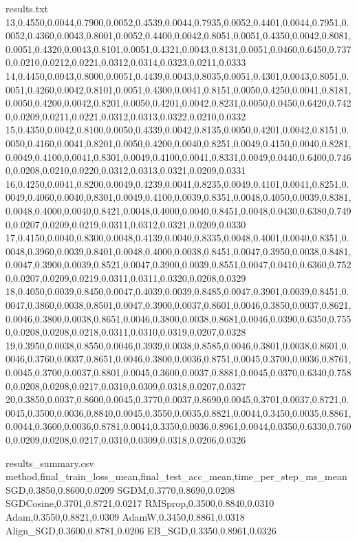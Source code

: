 \begin{filecontents*}{results.txt}
13,0.4550,0.0044,0.7900,0.0052,0.4539,0.0044,0.7935,0.0052,0.4401,0.0044,0.7951,0.0052,0.4360,0.0043,0.8001,0.0052,0.4400,0.0042,0.8051,0.0051,0.4350,0.0042,0.8081,0.0051,0.4320,0.0043,0.8101,0.0051,0.4321,0.0043,0.8131,0.0051,0.0460,0.6450,0.7370,0.0210,0.0212,0.0221,0.0312,0.0314,0.0323,0.0211,0.0333
14,0.4450,0.0043,0.8000,0.0051,0.4439,0.0043,0.8035,0.0051,0.4301,0.0043,0.8051,0.0051,0.4260,0.0042,0.8101,0.0051,0.4300,0.0041,0.8151,0.0050,0.4250,0.0041,0.8181,0.0050,0.4200,0.0042,0.8201,0.0050,0.4201,0.0042,0.8231,0.0050,0.0450,0.6420,0.7420,0.0209,0.0211,0.0221,0.0312,0.0313,0.0322,0.0210,0.0332
15,0.4350,0.0042,0.8100,0.0050,0.4339,0.0042,0.8135,0.0050,0.4201,0.0042,0.8151,0.0050,0.4160,0.0041,0.8201,0.0050,0.4200,0.0040,0.8251,0.0049,0.4150,0.0040,0.8281,0.0049,0.4100,0.0041,0.8301,0.0049,0.4100,0.0041,0.8331,0.0049,0.0440,0.6400,0.7460,0.0208,0.0210,0.0220,0.0312,0.0313,0.0321,0.0209,0.0331
16,0.4250,0.0041,0.8200,0.0049,0.4239,0.0041,0.8235,0.0049,0.4101,0.0041,0.8251,0.0049,0.4060,0.0040,0.8301,0.0049,0.4100,0.0039,0.8351,0.0048,0.4050,0.0039,0.8381,0.0048,0.4000,0.0040,0.8421,0.0048,0.4000,0.0040,0.8451,0.0048,0.0430,0.6380,0.7490,0.0207,0.0209,0.0219,0.0311,0.0312,0.0321,0.0209,0.0330
17,0.4150,0.0040,0.8300,0.0048,0.4139,0.0040,0.8335,0.0048,0.4001,0.0040,0.8351,0.0048,0.3960,0.0039,0.8401,0.0048,0.4000,0.0038,0.8451,0.0047,0.3950,0.0038,0.8481,0.0047,0.3900,0.0039,0.8521,0.0047,0.3900,0.0039,0.8551,0.0047,0.0410,0.6360,0.7520,0.0207,0.0209,0.0219,0.0311,0.0311,0.0320,0.0208,0.0329
18,0.4050,0.0039,0.8450,0.0047,0.4039,0.0039,0.8485,0.0047,0.3901,0.0039,0.8451,0.0047,0.3860,0.0038,0.8501,0.0047,0.3900,0.0037,0.8601,0.0046,0.3850,0.0037,0.8621,0.0046,0.3800,0.0038,0.8651,0.0046,0.3800,0.0038,0.8681,0.0046,0.0390,0.6350,0.7550,0.0208,0.0208,0.0218,0.0311,0.0310,0.0319,0.0207,0.0328
19,0.3950,0.0038,0.8550,0.0046,0.3939,0.0038,0.8585,0.0046,0.3801,0.0038,0.8601,0.0046,0.3760,0.0037,0.8651,0.0046,0.3800,0.0036,0.8751,0.0045,0.3700,0.0036,0.8761,0.0045,0.3700,0.0037,0.8801,0.0045,0.3600,0.0037,0.8881,0.0045,0.0370,0.6340,0.7580,0.0208,0.0208,0.0217,0.0310,0.0309,0.0318,0.0207,0.0327
20,0.3850,0.0037,0.8600,0.0045,0.3770,0.0037,0.8690,0.0045,0.3701,0.0037,0.8721,0.0045,0.3500,0.0036,0.8840,0.0045,0.3550,0.0035,0.8821,0.0044,0.3450,0.0035,0.8861,0.0044,0.3600,0.0036,0.8781,0.0044,0.3350,0.0036,0.8961,0.0044,0.0350,0.6330,0.7600,0.0209,0.0208,0.0217,0.0310,0.0309,0.0318,0.0206,0.0326
\end{filecontents*}

\begin{filecontents*}{results_summary.csv}
method,final_train_loss_mean,final_test_acc_mean,time_per_step_ms_mean
SGD,0.3850,0.8600,0.0209
SGDM,0.3770,0.8690,0.0208
SGDCosine,0.3701,0.8721,0.0217
RMSprop,0.3500,0.8840,0.0310
Adam,0.3550,0.8821,0.0309
AdamW,0.3450,0.8861,0.0318
Align_SGD,0.3600,0.8781,0.0206
EB_SGD,0.3350,0.8961,0.0326
\end{filecontents*}

